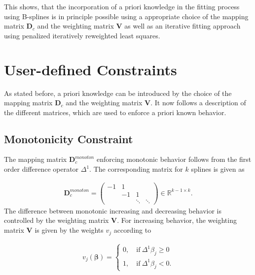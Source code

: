 \documentclass[10pt,a4paper]{article}
\begin{document}
	This shows, that the incorporation of a priori knowledge in the fitting process using B-splines is in principle possible using a appropriate choice of the mapping matrix $\boldsymbol{D}_c$ and the weighting matrix $\boldsymbol{V}$ as well as an iterative fitting approach using penalized iteratively reweighted least squares. 
		
	\section{User-defined Constraints} \label{sec:user-defined-constraints}
	
	As stated before, a priori knowledge can be introduced by the choice of the mapping matrix $\boldsymbol{D}_c$ and the weighting matrix $\boldsymbol{V}$. It now follows a description of the different matrices, which are used to enforce a priori known behavior. 
	
	\subsection{Monotonicity Constraint}
	
	The mapping matrix $\boldsymbol{D}_c^{monoton}$ enforcing monotonic behavior follows from the first order difference operator $\Delta^1$. The corresponding matrix for $k$ splines is given as
	
	\begin{align} \label{eq:D_c_monoton}
		\boldsymbol{D}_c^{monoton} = \begin{pmatrix}  -1 & 1  &  		& \\ 
		  												 & -1 & 1 		& \\ 
														 &    & \ddots  & \ddots  
		\end{pmatrix} \in \mathbb{R}^{k-1 \times k}.
	\end{align}
	The difference between monotonic increasing and decreasing behavior is controlled by the weighting matrix $\boldsymbol{V}$. For increasing behavior, the weighting matrix $\boldsymbol{V}$ is given by the weights $v_j$ according to
	
	\begin{align} \label{eq:v_monoton_inc}
		v_j(\boldsymbol{\beta}) = \begin{cases} 0, \quad \text{if} \ \Delta^1\beta_j \ge 0 \\ 
					        					1, \quad \text{if} \ \Delta^1\beta_j < 0.
			\end{cases}	
	\end{align}
	
\end{document}
